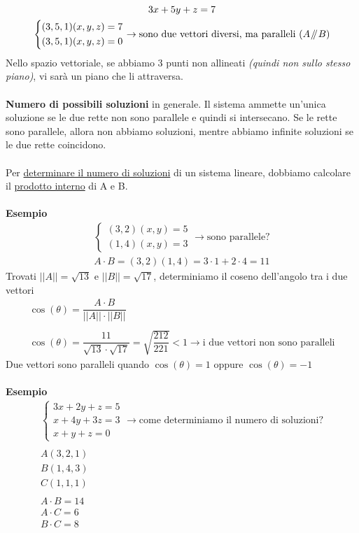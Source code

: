 \documentclass[italian]{article}
\newcommand{\parallele}{\mathbin{\!/\mkern-5mu/\!}}
\begin{document}
\begin{gather*}
	3x + 5y + z = 7 \\
	\begin{cases*}
		(3,5,1)(x,y,z)=7\\
		(3,5,1)(x,y,z)=0
	\end{cases*}
	\to \text{sono due vettori diversi, ma paralleli ($A \parallele B$)} 
\end{gather*}
Nello spazio vettoriale, se abbiamo 3 punti non allineati \textit{(quindi non sullo stesso piano)}, vi sarà un piano che li attraversa.\\\\
\textbf{Numero di possibili soluzioni} in generale. Il sistema ammette
un’unica soluzione se le due rette non sono parallele e quindi si intersecano. Se le rette sono parallele, allora non abbiamo soluzioni, mentre abbiamo infinite soluzioni se le due rette coincidono.\\\\
Per \underline{determinare il numero di soluzioni} di un sistema lineare, dobbiamo calcolare il \underline{prodotto interno} di A e B.\\\\
\textbf{Esempio}
\begin{gather*}
	\begin{cases*}
		(3,2)(x,y)=5\\
		(1,4)(x,y)=3
	\end{cases*}	
	\to \text{sono parallele?}\\
	A\cdot B = (3,2)(1,4)=3\cdot 1 + 2 \cdot 4 = 11
\end{gather*}
Trovati $||A|| = \sqrt{13}$ e $||B|| = \sqrt{17}$, determiniamo il coseno dell'angolo tra i due vettori
\begin{gather*}
	\cos (\theta) = \dfrac{A\cdot B}{||A||\cdot ||B||}\\\\
	\cos (\theta) = \dfrac{11}{\sqrt{13}\cdot \sqrt{17}} = \sqrt{\dfrac{212}{221}} < 1	\to \text{i due vettori non sono paralleli}
\end{gather*}
Due vettori sono paralleli quando $\cos (\theta) = 1 $ oppure $\cos (\theta) = -1 $\\\\
\textbf{Esempio}
\begin{gather*}
	\begin{cases*}
		3x+2y+z=5\\
		x+4y+3z=3\\
		x+y+z = 0
	\end{cases*}	
	\to \text{come determiniamo il numero di soluzioni?}\\\\
	A(3,2,1)\\
	B(1,4,3)\\
	C(1,1,1)\\\\
	A\cdot B = 14\\
	A \cdot C = 6\\
	B\cdot C = 8
\end{gather*}
\end{document}
